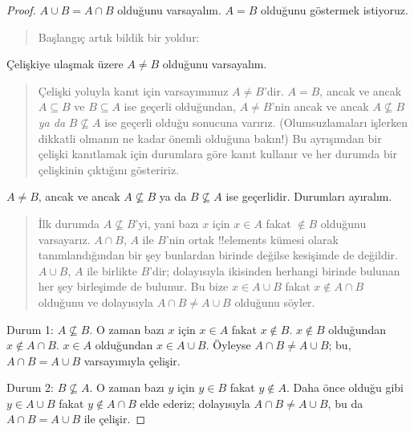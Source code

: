 \begin{proof}
  $A \cup B = A \cap B$ olduğunu varsayalım. $A = B$ olduğunu göstermek
  istiyoruz.
  \begin{quote}
    Başlangıç artık bildik bir yoldur:
  \end{quote}
  Çelişkiye ulaşmak üzere $A \neq B$ olduğunu varsayalım.
  \begin{quote}
    Çelişki yoluyla kanıt için varsayımımız $A \neq B$'dir. $A = B$,
    ancak ve ancak $A \subseteq B$ ve $B \subseteq A$ ise geçerli
    olduğundan, $A \neq B$'nin ancak ve ancak $A \nsubseteq B$ \emph{ya
    da} $B \nsubseteq A$ ise geçerli olduğu sonucuna varırız.
    (Olumsuzlamaları işlerken dikkatli olmanın ne kadar önemli olduğuna
    bakın!{}) Bu ayrışımdan bir çelişki kanıtlamak için durumlara göre
    kanıt kullanır ve her durumda bir çelişkinin çıktığını gösteririz.
  \end{quote}
  $A \neq B$, ancak ve ancak $A \nsubseteq B$ ya da $B \nsubseteq A$
  ise geçerlidir. Durumları ayıralım.
  \begin{quote}
    İlk durumda $A \nsubseteq B$'yi, yani bazı $x$ için $x \in A$ fakat
    $\notin B$ olduğunu varsayarız. $A \cap B$, $A$ ile $B$'nin ortak
    !!{element}s kümesi olarak tanımlandığından bir şey bunlardan birinde
    değilse kesişimde de değildir. $A \cup B$, $A$ ile birlikte $B$'dir;
    dolayısıyla ikisinden herhangi birinde bulunan her şey birleşimde
    de bulunur. Bu bize $x \in A \cup B$ fakat $x \notin A \cap B$
    olduğunu ve dolayısıyla $A \cap B \neq A \cup B$ olduğunu söyler.
  \end{quote}

  Durum 1: $A \nsubseteq B$. O zaman bazı $x$ için $x \in A$ fakat $x
  \notin B$. $x \notin B$ olduğundan $x \notin A \cap B$. $x \in A$
  olduğundan $x \in A \cup B$. Öyleyse $A \cap B \neq A \cup B$;
  bu, $A \cap B = A \cup B$ varsayımıyla çelişir.

  Durum 2: $B \nsubseteq A$. O zaman bazı $y$ için $y \in B$ fakat $y
  \notin A$. Daha önce olduğu gibi $y \in A \cup B$ fakat $y \notin A
  \cap B$ elde ederiz; dolayısıyla $A \cap B \neq A \cup B$, bu da $A
  \cap B = A \cup B$ ile çelişir.
\end{proof}

